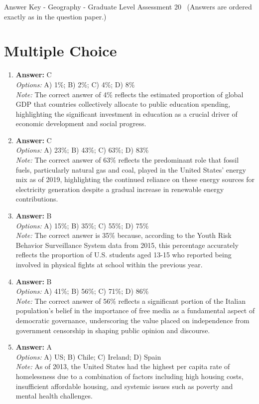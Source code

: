 \documentclass[12pt]{article}
\begin{document}
\begin{center}
Answer Key - Geography - Graduate Level Assessment 20 \
\small (Answers are ordered exactly as in the question paper.)
\end{center}

\section*{Multiple Choice}
\begin{enumerate}[label=\arabic*.]
\item \textbf{Answer:} C
\\ \textit{Options:} A) 1\%; B) 2\%; C) 4\%; D) 8\%
\\ \textit{Note:} The correct answer of 4\% reflects the estimated proportion of global GDP that countries collectively allocate to public education spending, highlighting the significant investment in education as a crucial driver of economic development and social progress.
\item \textbf{Answer:} C
\\ \textit{Options:} A) 23\%; B) 43\%; C) 63\%; D) 83\%
\\ \textit{Note:} The correct answer of 63\% reflects the predominant role that fossil fuels, particularly natural gas and coal, played in the United States' energy mix as of 2019, highlighting the continued reliance on these energy sources for electricity generation despite a gradual increase in renewable energy contributions.
\item \textbf{Answer:} B
\\ \textit{Options:} A) 15\%; B) 35\%; C) 55\%; D) 75\%
\\ \textit{Note:} The correct answer is 35\% because, according to the Youth Risk Behavior Surveillance System data from 2015, this percentage accurately reflects the proportion of U.S. students aged 13-15 who reported being involved in physical fights at school within the previous year.
\item \textbf{Answer:} B
\\ \textit{Options:} A) 41\%; B) 56\%; C) 71\%; D) 86\%
\\ \textit{Note:} The correct answer of 56\% reflects a significant portion of the Italian population's belief in the importance of free media as a fundamental aspect of democratic governance, underscoring the value placed on independence from government censorship in shaping public opinion and discourse.
\item \textbf{Answer:} A
\\ \textit{Options:} A) US; B) Chile; C) Ireland; D) Spain
\\ \textit{Note:} As of 2013, the United States had the highest per capita rate of homelessness due to a combination of factors including high housing costs, insufficient affordable housing, and systemic issues such as poverty and mental health challenges.
\end{enumerate}
\end{document}
